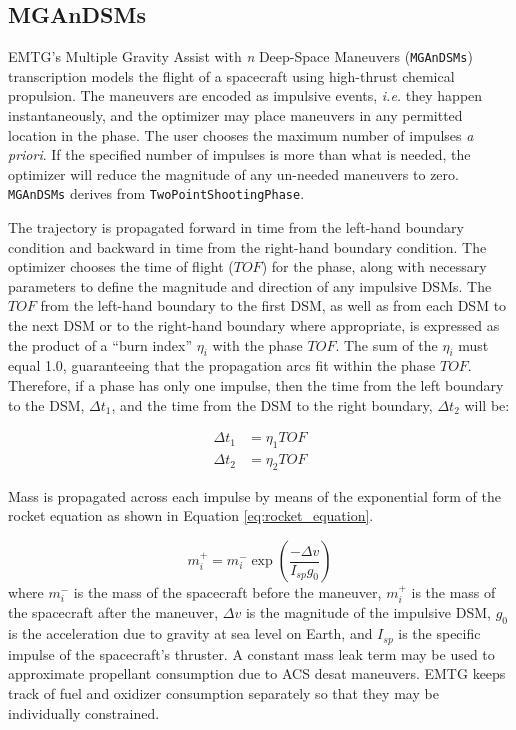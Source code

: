 \subsection{MGAnDSMs}
\label{subsec:MGAnDSMs}

\ac{EMTG}'s Multiple Gravity Assist with \textit{n} Deep-Space Maneuvers (\texttt{MGAnDSMs}) transcription models the flight of a spacecraft using high-thrust chemical propulsion. The maneuvers are encoded as impulsive events, \textit{i.e.} they happen instantaneously, and the optimizer may place maneuvers in any permitted location in the phase. The user chooses the maximum number of impulses \textit{a priori}. If the specified number of impulses is more than what is needed, the optimizer will reduce the magnitude of any un-needed maneuvers to zero. \texttt{MGAnDSMs} derives from \texttt{TwoPointShootingPhase}.

The trajectory is propagated forward in time from the left-hand boundary condition and backward in time from the right-hand boundary condition. The optimizer chooses the time of flight ($TOF$) for the phase, along with necessary parameters to define the magnitude and direction of any impulsive \ac{DSM}s. The $TOF$ from the left-hand boundary to the first \ac{DSM}, as well as from each \ac{DSM} to the next \ac{DSM} or to the right-hand boundary where appropriate, is expressed as the product of a ``burn index'' $\eta_i$ with the phase $TOF$. The sum of the $\eta_i$ must equal 1.0, guaranteeing that the propagation arcs fit within the phase $TOF$. Therefore, if a phase has only one impulse, then the time from the left boundary to the \ac{DSM}, $\Delta t_1$, and the time from the DSM to the right boundary, $\Delta t_2$ will be:

\begin{align}
\Delta t_1 &= \eta_1 TOF\\
\Delta t_2 &= \eta_2 TOF
\label{eq:MGAnDSMs_time_calculations}
\end{align}

Mass is propagated across each impulse by means of the exponential form of the rocket equation as shown in Equation \ref{eq:rocket_equation}.

\begin{equation}
m_i^+ = m_i^- \exp \left(\frac{-\Delta v}{I_{sp} g_0}\right)
\label{eq:rocket_equation}
\end{equation}
%
where $m_i^-$ is the mass of the spacecraft before the maneuver, $m_i^+$ is the mass of the spacecraft after the maneuver, $\Delta v$ is the magnitude of the impulsive \ac{DSM}, $g_0$ is the acceleration due to gravity at sea level on Earth, and $I_{sp}$ is the specific impulse of the spacecraft's thruster. A constant mass leak term may be used to approximate propellant consumption due to \ac{ACS} desat maneuvers. \ac{EMTG} keeps track of fuel and oxidizer consumption separately so that they may be individually constrained.


